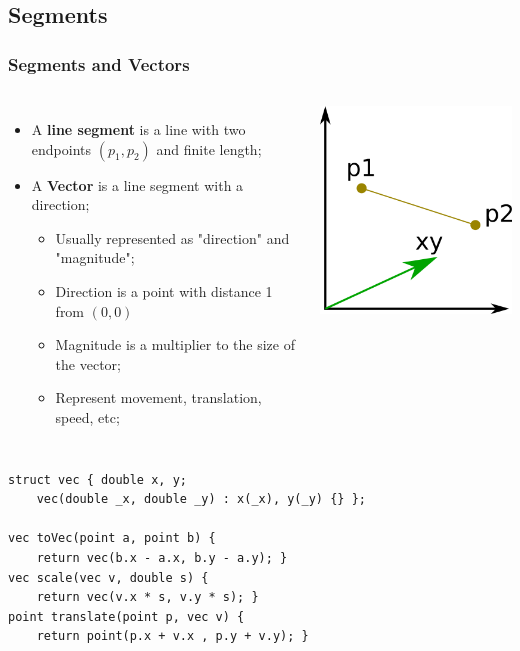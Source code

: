 \subsection{Segments}
\begin{frame}[fragile]
  \frametitle{Segments and Vectors}
    \begin{columns}
      \begin{itemize}
        \item A {\bf line segment} is a line with two endpoints $(p_1, p_2)$ and finite length;
        \item A {\bf Vector} is a line segment with a direction;
        \begin{itemize}
          \item Usually represented as "direction" and "magnitude";
          \item Direction is a point with distance 1 from $(0,0)$
          \item Magnitude is a multiplier to the size of the vector;
          \item Represent movement, translation, speed, etc;
        \end{itemize}
      \end{itemize}
      \includegraphics[width=.9\textwidth]{../img/geom4}
    \end{columns}

{\smaller
    \begin{exampleblock}{}
\begin{verbatim}
struct vec { double x, y;
    vec(double _x, double _y) : x(_x), y(_y) {} };

vec toVec(point a, point b) {
    return vec(b.x - a.x, b.y - a.y); }
vec scale(vec v, double s) {
    return vec(v.x * s, v.y * s); }
point translate(point p, vec v) {
    return point(p.x + v.x , p.y + v.y); }
\end{verbatim}
    \end{exampleblock}
  }
\end{frame}

